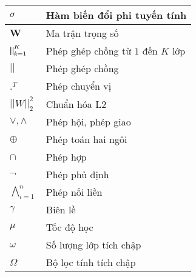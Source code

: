 \begin{center}
\begin{longtable}{|p{2cm}|p{14cm}|}
		\hline
		$\sigma$ & Hàm biến đổi phi tuyến tính \\
		\hline
		$\mathbf{W}$ & Ma trận trọng số \\
		\hline
		$\bigparallel_{k=1}^{K}$ & Phép ghép chồng từ $1$ đến $K$ lớp \\
		\hline
		$||$ & Phép ghép chồng \\
		\hline
		${.}^T$ & Phép chuyển vị \\
		\hline
		$|| W ||^2_2$ & Chuẩn hóa L2 \\
		\hline
		$\vee, \wedge$ & Phép hội, phép giao \\
		\hline
		$\oplus$ & Phép toán hai ngôi \\
		\hline
		$\cap$ & Phép hợp \\
		\hline
		$\neg$ & Phép phủ định \\
		\hline
		$\bigwedge^n_{i=1}$ & Phép nối liền \\
		\hline
		$\gamma$ & Biên lề \\
		\hline
		$\mu$ & Tốc độ học \\
		\hline
		$\omega$ & Số lượng lớp tích chập \\
		\hline
		$\Omega$ & Bộ lọc tính tích chập \\
		\hline
	\end{longtable}
\end{center}


\pagebreak
